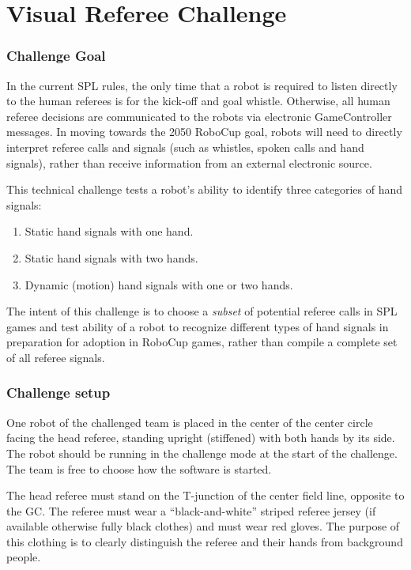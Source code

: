\section{Visual Referee Challenge}

\subsubsection{Challenge Goal}

In the current SPL rules, the only time that a robot is required to listen directly to the human referees is for the kick-off and goal whistle. Otherwise, all human referee decisions are communicated to the robots via electronic GameController messages. In moving towards the 2050 RoboCup goal, robots will need to directly interpret referee calls and signals (such as whistles, spoken calls and hand signals), rather than receive information from an external electronic source.

This technical challenge tests a robot's ability to identify three categories of hand signals:
\begin{enumerate}
    \item Static hand signals with one hand.
    \item Static hand signals with two hands.
    \item Dynamic (motion) hand signals with one or two hands.
\end{enumerate}

The intent of this challenge is to choose a \emph{subset} of potential referee calls in SPL games and test ability of a robot to recognize different types of hand signals in preparation for adoption in RoboCup games, rather than compile a complete set of all referee signals.

\subsubsection{Challenge setup}

One robot of the challenged team is placed in the center of the center circle facing the head referee, standing upright (stiffened) with both hands by its side. The robot should be running in the challenge mode at the start of the challenge. The team is free to choose how the software is started.

The head referee must stand on the T-junction of the center field line, opposite to the GC. The referee must wear a ``black-and-white'' striped referee jersey (if available otherwise fully black clothes) and must wear red gloves. The purpose of this clothing is to clearly distinguish the referee and their hands from background people. 

